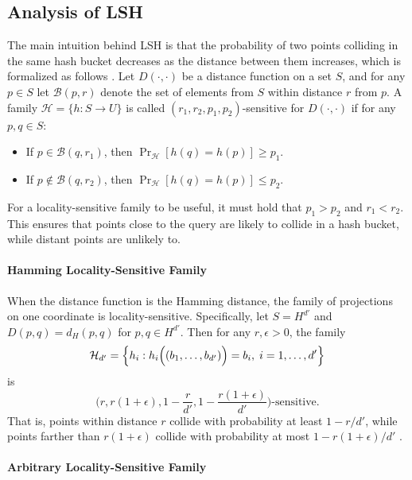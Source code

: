 

\subsection{Analysis of LSH}

The main intuition behind LSH is that the probability of two points colliding in the same hash bucket decreases as the distance between them increases, which is formalized as follows \cite{Gionis-Indyk-Motwani-1999}. Let $D(\cdot, \cdot)$ be a distance function on a set $S$, and for any $p \in S$ let $\mathcal{B}(p, r)$ denote the set of elements from $S$ within distance $r$ from $p$. A family $\mathcal{H} = \{h: S \to U\}$ is called $(r_1, r_2, p_1, p_2)$-sensitive for $D(\cdot, \cdot)$ if for any $p, q \in S$:

\begin{itemize}
    \item If $p \in \mathcal{B}(q, r_1)$, then $\Pr_{\mathcal{H}}[h(q) = h(p)] \ge p_1$.
    \item If $p \notin \mathcal{B}(q, r_2)$, then $\Pr_{\mathcal{H}}[h(q) = h(p)] \le p_2$.
\end{itemize}

For a locality-sensitive family to be useful, it must hold that $p_1 > p_2$ and $r_1 < r_2$. This ensures that points close to the query are likely to collide in a hash bucket, while distant points are unlikely to.

\paragraph{Hamming Locality-Sensitive Family}

When the distance function is the Hamming distance, the family of projections on one coordinate is locality-sensitive. Specifically, let $S = H^{d'}$ and $D(p, q) = d_H(p, q)$ for $p, q \in H^{d'}$. Then for any $r, \epsilon > 0$, the family
\[
\mathcal{H}_{d'} = \Bigl\{ h_i : h_i\Bigl((b_1, \dots, b_{d'})\Bigr) = b_i, \; i = 1, \dots, d' \Bigr\}
\]
is 
\[
\Big(r, r(1 + \epsilon), 1 - \frac{r}{d'}, 1 - \frac{r(1 + \epsilon)}{d'}\Big)\text{-sensitive}.
\] 
That is, points within distance $r$ collide with probability at least $1 - r/d'$, while points farther than $r(1 + \epsilon)$ collide with probability at most $1 - r(1 + \epsilon)/d'$ \cite{Gionis-Indyk-Motwani-1999}.

\paragraph{Arbitrary Locality-Sensitive Family}

